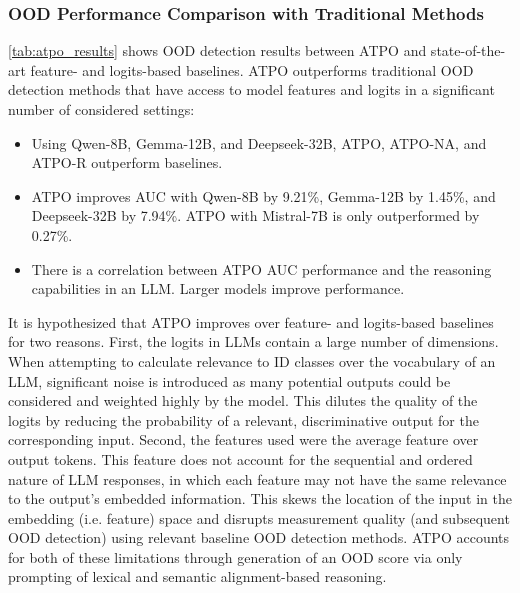 \subsubsection{OOD Performance Comparison with Traditional Methods}

\ref{tab:atpo_results} shows OOD detection results between ATPO and state-of-the-art feature- and logits-based baselines. ATPO outperforms traditional OOD detection methods that have access to model features and logits in a significant number of considered settings:
\begin{itemize}
    \item Using Qwen-8B, Gemma-12B, and Deepseek-32B, ATPO, ATPO-NA, and ATPO-R outperform baselines.
    \item ATPO improves AUC with Qwen-8B by 9.21\%, Gemma-12B by 1.45\%, and Deepseek-32B by 7.94\%. ATPO with Mistral-7B is only outperformed by 0.27\%.
    \item There is a correlation between ATPO AUC performance and the reasoning capabilities in an LLM. Larger models improve performance.
\end{itemize}
It is hypothesized that ATPO improves over feature- and logits-based baselines for two reasons. First, the logits in LLMs contain a large number of dimensions. When attempting to calculate relevance to ID classes over the vocabulary of an LLM, significant noise is introduced as many potential outputs could be considered and weighted highly by the model. This dilutes the quality of the logits by reducing the probability of a relevant, discriminative output for the corresponding input. Second, the features used were the average feature over output tokens. This feature does not account for the sequential and ordered nature of LLM responses, in which each feature may not have the same relevance to the output's embedded information. This skews the location of the input in the embedding (i.e. feature) space and disrupts measurement quality (and subsequent OOD detection) using relevant baseline OOD detection methods. ATPO accounts for both of these limitations through generation of an OOD score via only prompting of lexical and semantic alignment-based reasoning.
